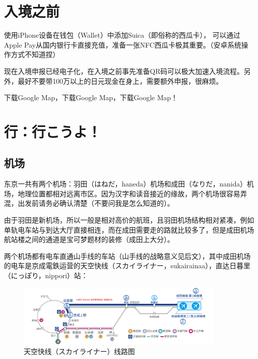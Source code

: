 \documentclass{article}
\begin{document}
\tableofcontents %
\newpage

\section{入境之前}
使用iPhone设备在钱包（Wallet）中添加Suica（即俗称的西瓜卡）， 可以通过Apple Pay从国内银行卡直接充值，准备一张NFC西瓜卡极其重要。（安卓系统操作方式不知道捏）\par
现在入境申报已经电子化，在入境之前事先准备QR码可以极大加速入境流程。另外，最好不要带100万以上的日元现金在身上，需要额外申报，很麻烦。\par
下载Google Map，下载Google Map，下载Google Map！
\section{行：行こうよ！}
\subsection{机场}
东京一共有两个机场：羽田（はねだ，haneda）机场和成田（なりだ，nanida）机场，地理位置都相对远离市区。因为汉字和读音接近的缘故，两个机场很容易弄混，出发前请务必确认清楚（不要问我是怎么知道的）。\par
由于羽田是新机场，所以一般是相对高价的航班，且羽田机场结构相对紧凑，例如单轨电车站与到达大厅直接相连，而在成田需要走的路就比较多了，但是成田机场航站楼之间的通道是宝可梦题材的装修（成田上大分）。\par
两个机场都有电车直通山手线的车站（山手线的战略意义见后文），其中成田机场的电车是京成電鉄运营的天空快线（スカイライナー，sukairainaa），直达日暮里（にっぽり，nippori）站：
\begin{figure}[h!]
    \centering
    \includegraphics[width=0.9\textwidth]{./fig/routemap_skyliner.jpg} %
    \caption{天空快线（スカイライナー）线路图\protect\footnotemark}
\end{figure}
\end{document}
